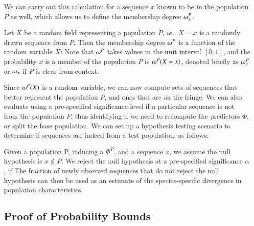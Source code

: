 \documentclass[onecolumn,10pt]{IEEEtran}
\begin{document}
We can carry out this calculation for a sequence $x$  known to be in the population $P$ as well, which allows us to define the membership degree $\omega^P_x$.
\begin{defn}
Let $X$ be a random field representing a population $P$, $ie.$. $X=x$ is a randomly drawn sequence from $P$. Then  the membership degree $\omega^P$ is  a function of the random variable $X$: 
Note that $\omega^P$ takes values in the unit interval $[0,1]$, and the probability  $x$ is a member of the population $P$ is $\omega^P(X=x)$, denoted briefly as $\omega_{x}^P$ or $\omega_{x}$ if $P$ is clear from context.
\end{defn}
Since $\omega^P(X)$ is a random variable, we can now compute sets of sequences that better represent the population $P$, and ones that are on the fringe. We can also evaluate using a pre-specified significance-level if a particular sequence is not from the population $P$, thus identifying if  we need to recompute the predictors $\Phi$, or split the base population. We can set up a hypothesis testing scenario to determine if sequences are indeed from a test population, as follows:

Given a population P, inducing a \qnet $\Phi^P$, and a sequence $x$, we assume the null hypothesis is $x \notin P$. We reject the null hypothesis at a pre-specified significance  $\alpha$, if 
The fraction of newly observed  sequences that do not reject the null hypothesis can then be used as an estimate of the species-specific divergence  in  population characteristics.





\subsection*{Proof of Probability Bounds}\label{sec:appendix}
\end{document}
